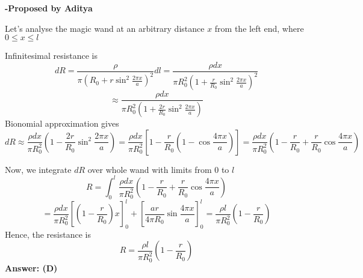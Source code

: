 \documentclass[11pt,a4paper]{scrartcl}
\begin{document}
\begin{flushright}
\textbf{\Large{-Proposed by Aditya}}
\end{flushright}
\begin{solution}

Let's analyse the magic wand at an arbitrary distance $x$ from the left end, where $0 \leq x \leq l$

Infinitesimal resistance is \[dR = \frac{\rho}{\pi \left(R_0 + r \sin^2 \frac{2 \pi x}{a} \right)^2} dl = \frac{\rho dx}{\pi R_{0}^2 \left( 1 + \frac{r}{R_0} \sin^2 \frac{2 \pi x}{a} \right)^2}\] 
\[\approx \frac{\rho dx}{\pi R_{0}^{2} \left( 1 + \frac{2r}{R_0} \sin^2 \frac{2 \pi x}{a} \right)}\]
Bionomial approximation gives \[dR \approx \frac{\rho dx}{\pi R_{0}^{2}} \left( 1 - \frac{2r}{R_0} \sin^2 \frac{2 \pi x}{a} \right) = \frac{\rho dx}{\pi R_{0}^{2}} \left[ 1 - \frac{r}{R_0} \left( 1 - \cos \frac{4\pi x}{a} \right) \right] = \frac{\rho dx}{\pi R_{0}^2} \left( 1 - \frac{r}{R_0} + \frac{r}{R_0} \cos \frac{4 \pi x}{a} \right)\]

Now, we integrate $dR$ over whole wand with limits from $0$ to $l$
\[R = \int_{0}^{l} \frac{\rho dx}{\pi R_{0}^2} \left( 1 - \frac{r}{R_0} + \frac{r}{R_0} \cos \frac{4 \pi x}{a} \right)\]
\[= \frac{\rho dx}{\pi R_{0}^2} \left[ \left( 1 - \frac{r}{R_0} \right) x \right]^{l}_{0} + \left[ \frac{ar}{4 \pi R_0} \sin \frac{4 \pi x}{a} \right]^{l}_{0} = \frac{\rho l}{\pi R_{0}^2} \left( 1 - \frac{r}{R_0} \right)\]
Hence, the resistance is \[\boxed{R = \frac{\rho l}{\pi R_{0}^2} \left( 1 - \frac{r}{R_0} \right)}\]
\textbf{Answer: (D)}

\end{solution}
\end{document}

